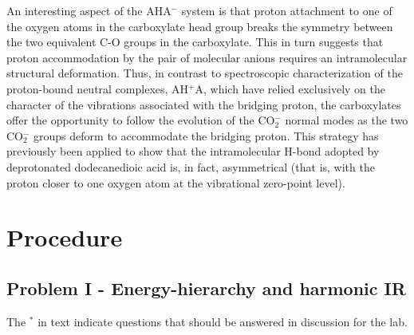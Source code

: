 \documentclass{tufte-handout}
\begin{document}
An interesting aspect of the AHA$^-$ system is that proton attachment to one of the oxygen atoms in the carboxylate head group breaks the symmetry between the two equivalent C-O groups in the carboxylate. 
This in turn suggests that proton accommodation by the pair of molecular anions requires an intramolecular structural deformation. 
Thus, in contrast to spectroscopic characterization of the proton-bound neutral complexes, AH$^+$A, which have relied exclusively on the character of the vibrations associated with the bridging proton, the carboxylates offer the opportunity to follow the evolution of the CO$_2^-$ normal modes as the two CO$_2^-$ groups deform to accommodate the bridging proton. 
This strategy has previously been applied to show that the intramolecular H-bond adopted by deprotonated dodecanedioic acid is, in fact, asymmetrical (that is, with the proton closer to one oxygen atom at the vibrational zero-point level).


\pagebreak

\section{Procedure} %
\label{sec:procedure}

\subsection{Problem I - Energy-hierarchy and harmonic IR}

The $^{*}$ in text indicate questions that should be answered in discussion for the lab. 
\end{document}
